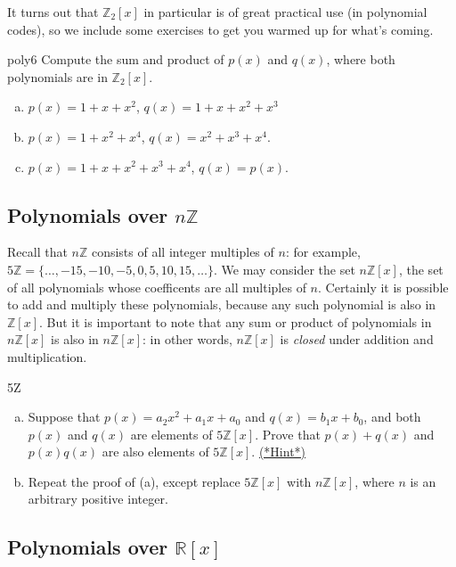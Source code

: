It turns out that $\mathbb{Z}_2[x]$ in particular is of great practical use (in polynomial codes), so we include some exercises to get you warmed up for what's coming.

\begin{exercise}{poly6}
Compute the sum and product of $p(x)$ and $q(x)$, where both polynomials are in $\mathbb{Z}_2[x]$.
\begin{enumerate}[(a)]
\item
$p(x)=  1+ x +x^2$, $q(x)= 1+x+x^2+x^3$
\item
$p(x)= 1 + x^2+x^4$, $q(x)=x^2+x^3+x^4 $.
\item
$p(x)= 1 +x+x^2+x^3+x^4 $, $q(x)=p(x)$.
\end{enumerate}
\end{exercise}

\subsection*{Polynomials over $n\mathbb{Z}$}
Recall that $n\mathbb{Z}$ consists of all integer multiples of $n$: for example, $5\mathbb{Z} = \{\ldots, -15,-10,-5,0,5,10,15,\ldots\}$.  
We may consider the set $n\mathbb{Z}[x]$, the set of all polynomials whose coefficents are all multiples of $n$.  Certainly it is possible to add and multiply 
these polynomials, because any such polynomial is also in $\mathbb{Z}[x]$.  But it is important to note that any sum or product of polynomials in 
$n\mathbb{Z}[x]$ is also in $n\mathbb{Z}[x]$: in other words, $n\mathbb{Z}[x]$ is \emph{closed} under addition and multiplication.


\begin{exercise}{5Z}
\begin{enumerate}[(a)]
\item
Suppose that $p(x) = a_2 x^2 + a_1 x + a_0$ and $q(x) = b_1 x + b_0$, and both $p(x)$ and $q(x)$ are elements of $5\mathbb{Z}[x]$. Prove that 
$p(x) + q(x)$ and $p(x)  q(x)$ are also elements of $5\mathbb{Z}[x]$. \hyperref[sec:polyrings:hints]{(*Hint*)} 

\item
Repeat the proof of (a), except replace $5\mathbb{Z}[x]$ with $n\mathbb{Z}[x]$, where $n$ is an arbitrary positive integer.
\end{enumerate}
\end{exercise}

\subsection*{Polynomials over $\mathbb{R}[x]$}


